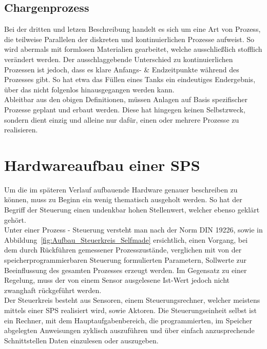 	\subsection{Chargenprozess}
	Bei der dritten und letzen Beschreibung handelt es sich um eine Art von Prozess, die teilweise Parallelen der diskreten und kontinuierlichen Prozesse aufweist. So wird abermals mit formlosen Materialien gearbeitet, welche ausschließlich stofflich verändert werden. Der ausschlaggebende Unterschied zu kontinuierlichen Prozessen ist jedoch, dass es klare Anfangs- \& Endzeitpunkte während des Prozesses gibt. So hat etwa das Füllen eines Tanks ein eindeutiges Endergebnis, über das nicht folgenlos hinausgegangen werden kann.\\

	Ableitbar aus den obigen Definitionen, müssen Anlagen auf Basis spezifischer Prozesse geplant und erbaut werden. Diese hat hingegen keinen Selbstzweck, sondern dient einzig und alleine nur dafür, einen oder mehrere Prozesse zu realisieren.\\

	\section{Hardwareaufbau einer SPS}
	
	Um die im späteren Verlauf aufbauende Hardware genauer beschreiben zu können, muss zu Beginn ein wenig thematisch ausgeholt werden. So hat der Begriff der Steuerung einen undenkbar hohen Stellenwert, welcher ebenso geklärt gehört.\\

	Unter einer Prozess - Steuerung versteht man nach der Norm DIN 19226, sowie in Abbildung~\ref{fig:Aufbau_Steuerkreis_Selfmade} ersichtlich, einen Vorgang, bei dem durch Rückführen gemessener Prozesszustände, verglichen mit von der speicherprogrammierbaren Steuerung formulierten Parametern, Sollwerte zur Beeinflussung des gesamten Prozesses erzeugt werden. Im Gegensatz zu einer Regelung, muss der von einem Sensor ausgelesene Ist-Wert jedoch nicht zwanghaft rückgeführt werden.\\
	
	Der Steuerkreis besteht aus Sensoren, einem Steuerungsrechner, welcher meistens mittels einer SPS realisiert wird, sowie Aktoren. Die Steuerungseinheit selbst ist ein Rechner, mit dem Hauptaufgabenbereich, die programmierten, im Speicher abgelegten Anweisungen zyklisch auszuführen und über einfach anzusprechende Schnittstellen Daten einzulesen oder auszugeben. \cite{mseitz_sps} \\
	
